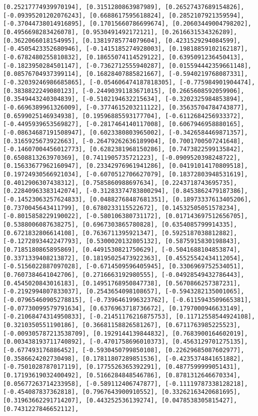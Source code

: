 \documentclass[11pt]{article}
\begin{document}
\begin{Verbatim}[commandchars=\\\{\}]
[0.25217774939970194], [0.3151280863987989], [0.26527437689154826], [-0.09395201202076243], [0.6688617595618824], [0.2852107921359594], [-0.37044738014916895], [0.17015660786699674], [0.20603449004798202], [0.4956698283426078], [0.9530491492172121], [0.2616631534326289], [0.3622066018154995], [0.13819785774079604], [0.4231529294084599], [-0.4505423352680946], [-0.1415185274928003], [0.19818859102162187], [-0.6782480255810832], [0.18655074114529122], [0.6395091236450413], [-0.1823950284501147], [-0.7362712555940287], [0.015594442359661148], [0.08576704937399114], [0.16828407885821667], [-0.5940219768087331], [-0.32039246986685865], [-0.054606474187818305], [-0.775984901904474], [0.3838822249080123], [-0.24490391183671015], [0.2665608592059906], [0.3549443240304839], [-0.5102194632215634], [-0.3202325984853894], [-0.6696389961326009], [-0.3774615203211122], [0.35635704784743877], [0.6599025146934938], [0.19596885593177704], [-0.6112684256933372], [-0.4495939653569827], [-0.2817464140117008], [0.6067946958880165], [-0.08634687191508947], [0.6023380803965002], [-0.3426584469871357], [0.3165925673922663], [-0.26479262636189904], [0.7001700507241648], [-0.14607004456012773], [0.6282381968150286], [0.7473822599135842], [0.6508813263970369], [0.7411905735721223], [-0.0909520398248722], [0.15633677962160947], [0.23342976961941286], [0.04191014170809518], [0.19724930566921034], [-0.6070512706627079], [0.18372803948531619], [0.4012906307438312], [0.7585860988697634], [0.2243718743695735], [0.22840963383142074], [-0.31283374783800294], [0.8453862479187386], [-0.14523063257624833], [0.04882768487681351], [0.18973337613405206], [0.7370045643411799], [0.6780233115522672], [0.14532505051578234], [-0.8015858229190022], [-0.580106380731172], [0.017143697512656705], [0.5388006087638275], [0.6967303865780828], [0.6354085799914335], [0.6721832806614108], [0.7636711395921347], [0.5925187038812882], [-0.1272893442247793], [0.5300020132805132], [0.5875915830198843], [0.7185180865895869], [0.4491530821750629], [-0.5041688104853874], [0.3371339408213872], [0.18195025473922363], [0.45525542434112054], [-0.5156022887097028], [-0.6714509596405945], [0.3306969752534051], [0.7607384641042706], [0.2716663192980555], [-0.04928549432786443], [0.4545020843016183], [0.14951768950847738], [0.5670866257387231], [-0.2192994807833037], [0.2543654098108657], [-0.5943282135001065], [-0.07965460905278815], [-0.7396461996323762], [-0.6115943509665381], [-0.07730099579791634], [0.6376963718736672], [0.1797000946633149], [-0.21068474314950833], [-0.21451176216875753], [0.11712558544924108], [0.3210350551190186], [0.36681158826581267], [0.6711763985225523], [-0.009305787213538709], [0.1929144139844832], [0.7683900164602019], [0.003438193711740892], [-0.4701758696010373], [0.4563129701275135], [-0.677493176886452], [-0.5930450799850108], [0.22629685087602977], [0.3586624202730498], [0.17811807289851536], [-0.4235374841651882], [-0.7501028787017119], [0.1775526365392291], [0.4877599999051431], [0.17193619032400492], [0.5166284848546786], [0.8781312646670334], [0.05677263714233958], [-0.589112406747877], [-0.11119787338128218], [-0.454087837362818], [0.7967643900910552], [0.33262163420681695], [0.31963662291714207], [0.443252536139274], [0.0478538305815427], [0.7431227846652112], 
\end{Verbatim}
\end{document}
